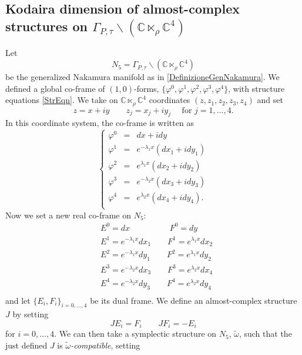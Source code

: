 \documentclass[a4paper, 11pt]{amsart}
\theoremstyle{plain}
\theoremstyle{definition}
\newcommand{\C}{\mathbb{C}}
\numberwithin{equation}{section}
\begin{document}
\subsection{Kodaira dimension of almost-complex structures on $\Gamma_{P, \tau} \backslash (\C \ltimes_{\rho} \C^{4})$} 
Let $$ N_{5} =  \Gamma_{P, \tau} \backslash (\C \ltimes_{\rho} \C^{4})$$ be the generalized Nakamura manifold as  in \eqref{DefinizioneGenNakamura}. We defined a global co-frame of $ (1,0) $-forms, $ \{\varphi^{0}, \varphi^{1}, \varphi^{2}, \varphi^{3}, \varphi^{4}\} $, with structure equations \eqref{StrEqn}. We take on $\C \ltimes_{\rho} \C^{4}  $ coordinates $ (z,z_{1}, z_{2}, z_{3}, z_{4}) $ and set 
 \[ z = x + iy \qquad z_{j} = x_{j} +iy_{j}  \quad \text{ for }  j = 1, \ldots, 4. \]
In this coordinate system, the co-frame is written as
\begin{equation*}
\left\{
\begin{array}{lll}
	\varphi^{0} &=& dx + i dy \\
	\varphi^{1} &=& e^{-\lambda_{1}x}(dx_{1} + idy_{1}) \\ \varphi^{2}&=& e^{\lambda_{1}x}(dx_{2} + idy_{2}) \\
	\varphi^{3} &=& e^{-\lambda_{2}x}(dx_{3} + idy_{3}) \\	\varphi^{4} &=& e^{\lambda_{2}x}(dx_{4} + idy_{4}). \\
\end{array}
\right.
\end{equation*}
Now we set a new real co-frame on $ N_{5} $:
\begin{equation*}
	\begin{split}
		& E^{0} = dx \qquad\qquad\,\,\,\,\,F^{0} = dy \\
		& E^{1} = e^{-\lambda_{1}x}dx_{1} \qquad F^{1} = e^{\lambda_{1}x}dx_{2}\\
		& E^{2} = e^{-\lambda_{1}x}dy_{1}  \qquad F^{2} = e^{\lambda_{1}x}dy_{2} \\
		& E^{3} = e^{-\lambda_{2}x}dx_{3} \qquad F^{3} = e^{\lambda_{2}x}dx_{4} \\
		& E^{4} = e^{-\lambda_{2}x}dy_{3} \qquad F^{4} = e^{\lambda_{2}x}dy_{4} \\
	\end{split}
\end{equation*}
and let $ \{E_{i}, F_{i}\}_{i = 0, \ldots, 4} $ be its dual frame. We define an almost-complex structure $ J $ by setting
\[ JE_{i} = F_{i} \qquad JF_{i} = - E_{i} \]
for $ i = 0, \ldots, 4 $. We can then take a symplectic structure on $ N_{5} $, $\tilde{\omega}$, such that the just defined $ J $ is \textit{$\tilde{\omega}$-compatible}, setting
\end{document}
